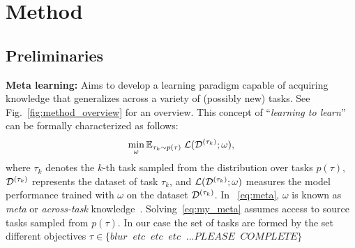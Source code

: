 

\section{Method}
\label{sec:method}

\subsection{Preliminaries}
\textbf{Meta learning:} Aims to develop a learning paradigm capable of acquiring knowledge that generalizes across a variety of (possibly new) tasks. See Fig.~\ref{fig:method_overview} for an overview. This concept of 
``{\it learning to learn}'' can be formally characterized as follows:
\begin{equation}
\min_{\omega} 	
\mathbb{E}_{ \tau_k \sim p(\tau)}\;
{\cal L}( {\cal D}^{(\tau_k)};\omega),
\label{eq:my_meta}
\end{equation}
where $\tau_k$ denotes the $k$-th task sampled from the distribution over tasks $p(\tau)$, ${\cal D}^{(\tau_k)}$ represents the dataset of task ${\tau_k}$, and
${\cal L}({\cal D}^{(\tau_k)};\omega)$
measures the model performance trained  with $\omega$ on the dataset ${\cal D}^{(\tau_k)}$. In ~\cref{eq:meta}, $\omega$ is known as {\it meta} or {\it across-task} knowledge~\cite{hospedales2021meta}. 
Solving~\cref{eq:my_meta} assumes access to source tasks sampled from $p(\tau)$. In our case the set of tasks are formed by the set different objectives  
$\tau \in \{ blur \;\; etc \;\; etc \;\; etc \;\; ... PLEASE \; \; COMPLETE\}$

